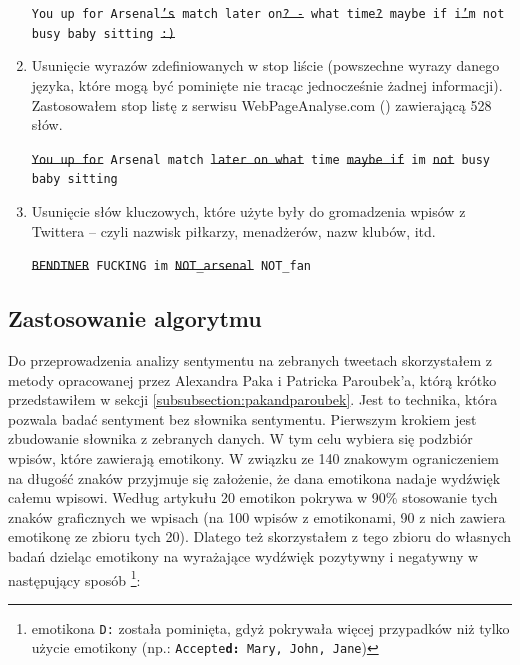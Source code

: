 \begin{enumerate}
  \texttt{You up for Arsenal\sout{'s} match later on\sout{? -} what
  time\sout{?} maybe if i\sout{'}m not busy baby sitting \sout{:)}} 
	
	\item Usunięcie wyrazów zdefiniowanych w stop liście (powszechne wyrazy danego
	języka, które mogą być pominięte nie tracąc jednocześnie żadnej informacji).
	Zastosowałem stop listę z serwisu \mbox{WebPageAnalyse.com} 
	(\cite{WebPageAnalyse}) zawierającą 528 słów.

	\texttt{\sout{You up for} Arsenal match \sout{later on what} time \sout{maybe if} 
 	im \sout{not} busy baby sitting}
	
	\item Usunięcie słów kluczowych, które użyte były do gromadzenia wpisów z
	Twittera -- czyli nazwisk piłkarzy, menadżerów, nazw klubów, itd.
	
	\texttt{\sout{BENDTNER} FUCKING im \sout{NOT\_arsenal} NOT\_fan}
	
\end{enumerate}





\subsection{Zastosowanie algorytmu}
\label{subsection:sentyment-algorytm}

Do przeprowadzenia analizy sentymentu na zebranych tweetach skorzystałem z
metody opracowanej przez Alexandra Paka i Patricka Paroubek'a, którą
krótko przedstawiłem w sekcji \ref{subsubsection:pakandparoubek}.
Jest to technika, która pozwala badać sentyment bez słownika sentymentu.
Pierwszym krokiem jest zbudowanie słownika z zebranych danych.
W tym celu wybiera się podzbiór wpisów, które zawierają emotikony.
W związku ze 140 znakowym ograniczeniem na długość znaków przyjmuje się
założenie, że dana emotikona nadaje wydźwięk całemu wpisowi.
Według artykułu \cite{EmoticonAnalysisTwitter} 20 emotikon pokrywa
w 90\% stosowanie tych znaków graficznych we wpisach (na 100 wpisów z
emotikonami, 90 z nich zawiera emotikonę ze zbioru tych 20). Dlatego też
skorzystałem z tego zbioru do własnych badań dzieląc emotikony na wyrażające
wydźwięk pozytywny i negatywny w następujący sposób \footnote{emotikona
\texttt{D:} została pominięta, gdyż pokrywała więcej przypadków niż tylko
użycie emotikony (np.: \texttt{Accepte\textbf{d:} Mary, John, Jane})}:

